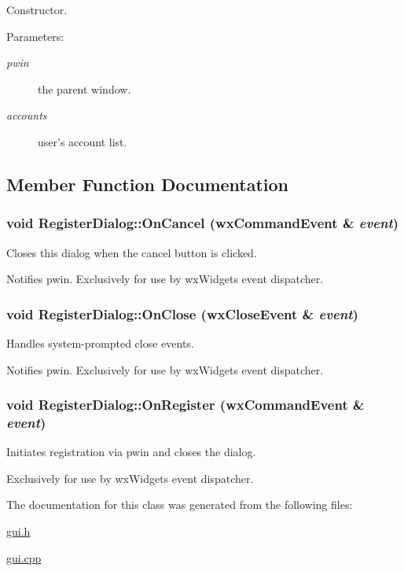 Constructor. 

\begin{Desc}
\item[Parameters:]
\begin{description}
\item[{\em pwin}]the parent window. \item[{\em accounts}]user's account list. \end{description}
\end{Desc}


\subsection{Member Function Documentation}
\hypertarget{classRegisterDialog_3389f6b8e9ec03901de4f5424d8ea201}{
\subsubsection[{OnCancel}]{\setlength{\rightskip}{0pt plus 5cm}void RegisterDialog::OnCancel (wxCommandEvent \& {\em event})}}
\label{classRegisterDialog_3389f6b8e9ec03901de4f5424d8ea201}


Closes this dialog when the cancel button is clicked. 

Notifies pwin. Exclusively for use by wxWidgets event dispatcher. \hypertarget{classRegisterDialog_6c95acf152a19de81ab996dcef977827}{
\subsubsection[{OnClose}]{\setlength{\rightskip}{0pt plus 5cm}void RegisterDialog::OnClose (wxCloseEvent \& {\em event})}}
\label{classRegisterDialog_6c95acf152a19de81ab996dcef977827}


Handles system-prompted close events. 

Notifies pwin. Exclusively for use by wxWidgets event dispatcher. \hypertarget{classRegisterDialog_334ccf10990ab1ec905088ea69187c2b}{
\subsubsection[{OnRegister}]{\setlength{\rightskip}{0pt plus 5cm}void RegisterDialog::OnRegister (wxCommandEvent \& {\em event})}}
\label{classRegisterDialog_334ccf10990ab1ec905088ea69187c2b}


Initiates registration via pwin and closes the dialog. 

Exclusively for use by wxWidgets event dispatcher. 

The documentation for this class was generated from the following files:\begin{CompactItemize}
\item 
\hyperlink{gui_8h}{gui.h}\item 
\hyperlink{gui_8cpp}{gui.cpp}\end{CompactItemize}
